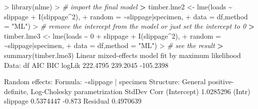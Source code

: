 \documentclass[
]{article}
\newenvironment{Shaded}{\begin{snugshade}}{\end{snugshade}}
\newcommand{\AttributeTok}[1]{\textcolor[rgb]{0.77,0.63,0.00}{#1}}
\newcommand{\CommentTok}[1]{\textcolor[rgb]{0.56,0.35,0.01}{\textit{#1}}}
\newcommand{\DecValTok}[1]{\textcolor[rgb]{0.00,0.00,0.81}{#1}}
\newcommand{\ErrorTok}[1]{\textcolor[rgb]{0.64,0.00,0.00}{\textbf{#1}}}
\newcommand{\FloatTok}[1]{\textcolor[rgb]{0.00,0.00,0.81}{#1}}
\newcommand{\FunctionTok}[1]{\textcolor[rgb]{0.00,0.00,0.00}{#1}}
\newcommand{\NormalTok}[1]{#1}
\newcommand{\OtherTok}[1]{\textcolor[rgb]{0.56,0.35,0.01}{#1}}
\newcommand{\SpecialCharTok}[1]{\textcolor[rgb]{0.00,0.00,0.00}{#1}}
\newcommand{\StringTok}[1]{\textcolor[rgb]{0.31,0.60,0.02}{#1}}
\begin{document}
\begin{Shaded}
\begin{Highlighting}[]
\SpecialCharTok{\textgreater{}} \FunctionTok{library}\NormalTok{(nlme)}
\SpecialCharTok{\textgreater{}} \CommentTok{\# import the final model}
\ErrorTok{\textgreater{}}\NormalTok{ timber.lme2 }\OtherTok{\textless{}{-}} \FunctionTok{lme}\NormalTok{(loads }\SpecialCharTok{\textasciitilde{}}\NormalTok{ slippage }\SpecialCharTok{+} \FunctionTok{I}\NormalTok{(slippage}\SpecialCharTok{\^{}}\DecValTok{2}\NormalTok{),}
\SpecialCharTok{+}                    \AttributeTok{random =} \SpecialCharTok{\textasciitilde{}}\NormalTok{slippage}\SpecialCharTok{|}\NormalTok{specimen,}
\SpecialCharTok{+}                    \AttributeTok{data =}\NormalTok{ df,}\AttributeTok{method =} \StringTok{"ML"}\NormalTok{)}
\SpecialCharTok{\textgreater{}} \CommentTok{\# remove the intercept from the model or just set the intercept to 0}
\ErrorTok{\textgreater{}}\NormalTok{ timber.lme3 }\OtherTok{\textless{}{-}} \FunctionTok{lme}\NormalTok{(loads }\SpecialCharTok{\textasciitilde{}} \DecValTok{0} \SpecialCharTok{+}\NormalTok{ slippage }\SpecialCharTok{+} \FunctionTok{I}\NormalTok{(slippage}\SpecialCharTok{\^{}}\DecValTok{2}\NormalTok{),}
\SpecialCharTok{+}                    \AttributeTok{random =} \SpecialCharTok{\textasciitilde{}}\NormalTok{slippage}\SpecialCharTok{|}\NormalTok{specimen,}
\SpecialCharTok{+}                    \AttributeTok{data =}\NormalTok{ df,}\AttributeTok{method =} \StringTok{"ML"}\NormalTok{)}
\SpecialCharTok{\textgreater{}} \CommentTok{\# see the result}
\ErrorTok{\textgreater{}} \FunctionTok{summary}\NormalTok{(timber.lme3)}
\NormalTok{Linear mixed}\SpecialCharTok{{-}}\NormalTok{effects model fit by maximum likelihood}
\NormalTok{  Data}\SpecialCharTok{:}\NormalTok{ df }
\NormalTok{       AIC      BIC    logLik}
  \FloatTok{222.4795} \FloatTok{239.2045} \SpecialCharTok{{-}}\FloatTok{105.2398}

\NormalTok{Random effects}\SpecialCharTok{:}
\NormalTok{ Formula}\SpecialCharTok{:} \ErrorTok{\textasciitilde{}}\NormalTok{slippage }\SpecialCharTok{|}\NormalTok{ specimen}
\NormalTok{ Structure}\SpecialCharTok{:}\NormalTok{ General positive}\SpecialCharTok{{-}}\NormalTok{definite, Log}\SpecialCharTok{{-}}\NormalTok{Cholesky parametrization}
\NormalTok{            StdDev    Corr  }
\NormalTok{(Intercept) }\FloatTok{1.0285296}\NormalTok{ (Intr)}
\NormalTok{slippage    }\FloatTok{0.5374447} \SpecialCharTok{{-}}\FloatTok{0.873}
\NormalTok{Residual    }\FloatTok{0.4970639}       


\end{Highlighting}
\end{Shaded}
\end{document}
